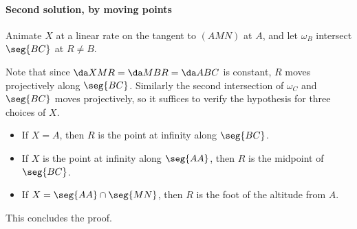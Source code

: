 \paragraph{Second solution, by moving points}     Animate $X$ at a linear rate on the tangent to $(AMN)$ at $A$, and let $\omega_B$ intersect $\seg{BC}$ at $R\ne B$.

Note that since $\da XMR=\da MBR=\da ABC$ is constant, $R$ moves projectively along $\seg{BC}$. Similarly the second intersection of $\omega_C$ and $\seg{BC}$ moves projectively, so it suffices to verify the hypothesis for three choices of $X$.
\begin{itemize}[itemsep=0em]
    \item If $X=A$, then $R$ is the point at infinity along $\seg{BC}$.
    \item If $X$ is the point at infinity along $\seg{AA}$, then $R$ is the midpoint of $\seg{BC}$.
    \item If $X=\seg{AA}\cap\seg{MN}$, then $R$ is the foot of the altitude from $A$.
\end{itemize}
This concludes the proof.

